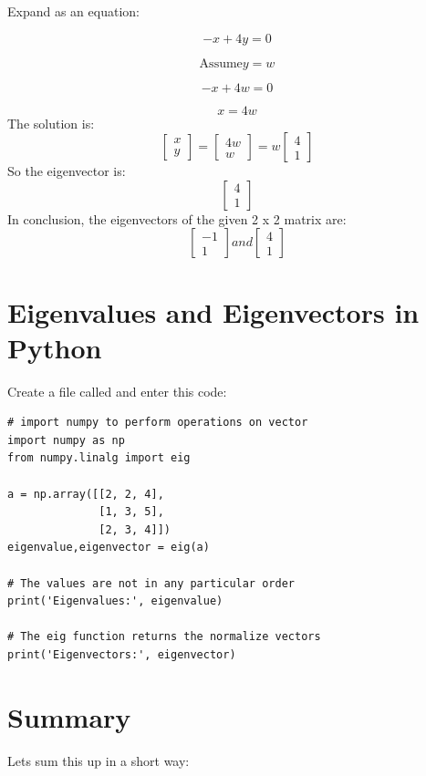 Expand as an equation:

$$-x + 4y = 0$$

$$\text{Assume} y = w$$

$$-x + 4w = 0$$

$$x = 4w$$
The solution is:
$$\begin{bmatrix}
x\\
y 
\end{bmatrix}=
\begin{bmatrix}
4w\\
w 
\end{bmatrix} =
w\begin{bmatrix}
4\\
1 
\end{bmatrix}$$
So the eigenvector is:
$$\begin{bmatrix}
4\\
1
\end{bmatrix}$$
In conclusion, the eigenvectors of the given 2 x 2 matrix are:
$$\begin{bmatrix}
-1\\
1
\end{bmatrix}
and \begin{bmatrix}
4\\
1
\end{bmatrix}$$

\section{Eigenvalues and Eigenvectors in Python}
Create a file called  and enter this code:

\begin{Verbatim}
# import numpy to perform operations on vector
import numpy as np
from numpy.linalg import eig

a = np.array([[2, 2, 4], 
              [1, 3, 5],
              [2, 3, 4]])
eigenvalue,eigenvector = eig(a)

# The values are not in any particular order
print('Eigenvalues:', eigenvalue)

# The eig function returns the normalize vectors
print('Eigenvectors:', eigenvector)

\end{Verbatim}

\section{Summary}
Lets sum this up in a short way:

